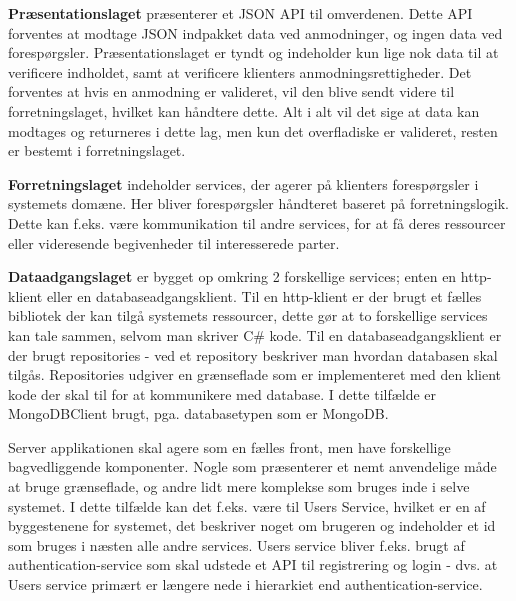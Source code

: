 \textbf{Præsentationslaget} præsenterer et JSON API til omverdenen. Dette API forventes at modtage JSON \cite[JSON]{converge-terms} indpakket data ved anmodninger, og ingen data ved forespørgsler. Præsentationslaget er tyndt og indeholder kun lige nok data til at verificere indholdet, samt at verificere klienters anmodningsrettigheder. Det forventes at hvis en anmodning er valideret, vil den blive sendt videre til forretningslaget, hvilket kan håndtere dette. Alt i alt vil det sige at data kan modtages og returneres i dette lag, men kun det overfladiske er valideret, resten er bestemt i forretningslaget.

\textbf{Forretningslaget} indeholder services, der agerer på klienters forespørgsler i systemets domæne. Her bliver forespørgsler håndteret baseret på forretningslogik. Dette kan f.eks. være kommunikation til andre services, for at få deres ressourcer eller videresende begivenheder til interesserede parter.

\textbf{Dataadgangslaget} er bygget op omkring 2 forskellige services; enten en http-klient eller en databaseadgangsklient. Til en http-klient er der brugt et fælles bibliotek der kan tilgå systemets ressourcer, dette gør at to forskellige services kan tale sammen, selvom man skriver C\# kode. Til en databaseadgangsklient er der brugt repositories - ved et repository beskriver man hvordan databasen skal tilgås. Repositories udgiver en grænseflade som er implementeret med den klient kode der skal til for at kommunikere med database. I dette tilfælde er MongoDBClient brugt, pga. databasetypen som er MongoDB.

Server applikationen skal agere som en fælles front, men have forskellige  bagvedliggende komponenter. Nogle som præsenterer et nemt anvendelige måde at bruge grænseflade, og andre lidt mere komplekse som bruges inde i selve systemet. I dette tilfælde kan det f.eks. være til Users Service, hvilket er en af byggestenene for systemet, det beskriver noget om brugeren og indeholder et id som bruges i næsten alle andre services. Users service bliver f.eks. brugt af authentication-service som skal udstede et API til registrering og login - dvs. at Users service primært er længere nede i hierarkiet end authentication-service.